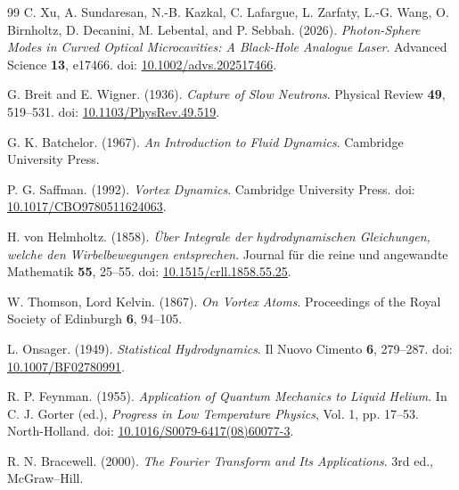 \begin{thebibliography}{99}
        C. Xu, A. Sundaresan, N.-B. Kazkal, C. Lafargue, L. Zarfaty,
        L.-G. Wang, O. Birnholtz, D. Decanini, M. Lebental, and P. Sebbah. (2026).
        \textit{Photon-Sphere Modes in Curved Optical Microcavities: A Black-Hole Analogue Laser}.
        Advanced Science \textbf{13}, e17466.
        doi: \href{https://doi.org/10.1002/advs.202517466}{10.1002/advs.202517466}.

        G. Breit and E. Wigner. (1936).
        \textit{Capture of Slow Neutrons}.
        Physical Review \textbf{49}, 519--531.
        doi: \href{https://doi.org/10.1103/PhysRev.49.519}{10.1103/PhysRev.49.519}.
        
        G. K. Batchelor. (1967).
        \textit{An Introduction to Fluid Dynamics}.
        Cambridge University Press.
        
        P. G. Saffman. (1992).
        \textit{Vortex Dynamics}.
        Cambridge University Press.
        doi: \href{https://doi.org/10.1017/CBO9780511624063}{10.1017/CBO9780511624063}.
        
        H. von Helmholtz. (1858).
        \textit{\"Uber Integrale der hydrodynamischen Gleichungen, welche den Wirbelbewegungen entsprechen}.
        Journal f\"ur die reine und angewandte Mathematik \textbf{55}, 25--55.
        doi: \href{https://doi.org/10.1515/crll.1858.55.25}{10.1515/crll.1858.55.25}.
        
        W. Thomson, Lord Kelvin. (1867).
        \textit{On Vortex Atoms}.
        Proceedings of the Royal Society of Edinburgh \textbf{6}, 94--105.
        
        L. Onsager. (1949).
        \textit{Statistical Hydrodynamics}.
        Il Nuovo Cimento \textbf{6}, 279--287.
        doi: \href{https://doi.org/10.1007/BF02780991}{10.1007/BF02780991}.
        
        R. P. Feynman. (1955).
        \textit{Application of Quantum Mechanics to Liquid Helium}.
        In C. J. Gorter (ed.), \textit{Progress in Low Temperature Physics}, Vol. 1, pp. 17--53.
        North-Holland.
        doi: \href{https://doi.org/10.1016/S0079-6417(08)60077-3}{10.1016/S0079-6417(08)60077-3}.
        
        R. N. Bracewell. (2000).
        \textit{The Fourier Transform and Its Applications}.
        3rd ed., McGraw--Hill.
        

\end{thebibliography}

